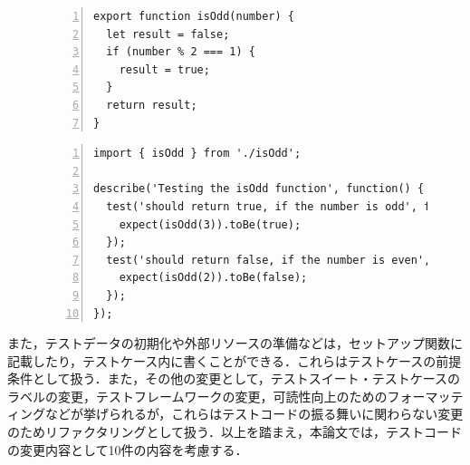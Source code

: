 \documentclass[11pt,dvipdfmx]{jreport}
\begin{document}
\begin{figure}[t]
  \begin{lstlisting}[caption={[upper/lower text]%
    \begin{tabular}[t]{@{}l@{}}
      isOdd.js \\[1.0\normalbaselineskip]
    \end{tabular}}, frame={tb}, numbers=left, label=isOdd.js, identifierstyle={\small}]
export function isOdd(number) {
  let result = false;
  if (number % 2 === 1) {
    result = true;
  }
  return result;
}
  \end{lstlisting}
  \vspace{-6mm}
\end{figure}


\begin{figure}[t]
  \begin{lstlisting}[caption={[upper/lower text]%
    \begin{tabular}[t]{@{}l@{}}
      isOdd.test.js \\[1.0\normalbaselineskip]
    \end{tabular}}, frame={tb}, numbers=left, label=isOdd.test.js, identifierstyle={\small}]
import { isOdd } from './isOdd';

describe('Testing the isOdd function', function() {
  test('should return true, if the number is odd', function() {
    expect(isOdd(3)).toBe(true);
  });
  test('should return false, if the number is even', function() {
    expect(isOdd(2)).toBe(false);
  });
});
  \end{lstlisting}
  \vspace{-6mm}
\end{figure}


また，テストデータの初期化や外部リソースの準備などは，セットアップ関数に記載したり，テストケース内に書くことができる．これらはテストケースの前提条件として扱う．また，その他の変更として，テストスイート・テストケースのラベルの変更，テストフレームワークの変更，可読性向上のためのフォーマッティングなどが挙げられるが，これらはテストコードの振る舞いに関わらない変更のためリファクタリングとして扱う．以上を踏まえ，本論文では，テストコードの変更内容として10件の内容を考慮する．
\end{document}
